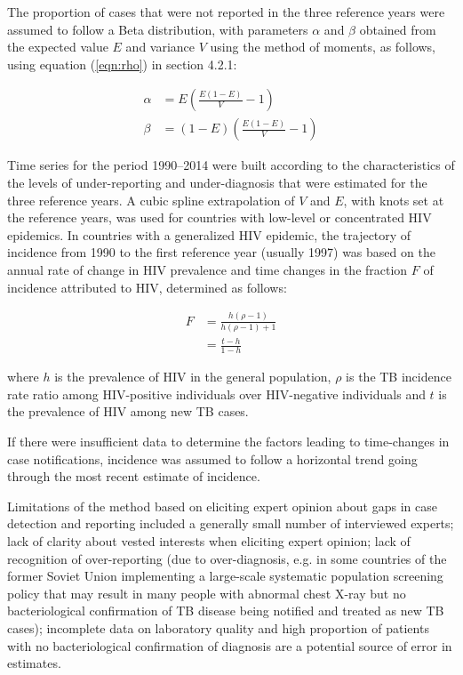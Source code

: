 The proportion of cases that were not reported in the three reference years were assumed to follow a Beta distribution, with parameters $\alpha$ and $\beta$ obtained from the expected value $E$ and variance $V$ using the method of moments\cite{Renyi2007}, as follows, using equation (\ref{eqn:rho}) in section 4.2.1: 

\begin{equation}
\begin{align}
\alpha &= E \left(\frac{E(1-E)}{V} - 1 \right) \\
\beta  &= (1-E)\left(\frac{E(1-E)}{V} - 1 \right)
\label{eqn:betamoments}
\end{align}
\end{equation}

Time series for the period 1990–2014 were built according to the characteristics of the levels of under-reporting and under-diagnosis that were estimated for the three reference years. A cubic spline extrapolation of $V$ and $E$, with knots set at the reference years, was used for countries with low-level or concentrated HIV epidemics. In countries with a generalized HIV epidemic, the trajectory of incidence from 1990 to the first reference year (usually 1997) was based on the annual rate of change in HIV prevalence and time changes in the fraction $F$ of incidence attributed to HIV, determined as follows:

\begin{align*}
F &= \frac{h(\rho - 1)}{h(\rho - 1) + 1} \\
  &= \frac{t - h}{1 - h}
\end{align*}

where $h$ is the prevalence of HIV in the general population, $\rho$ is the TB incidence rate ratio among HIV-positive individuals over HIV-negative individuals and $t$ is the prevalence of HIV among new TB cases.

If there were insufficient data to determine the factors leading to time-changes in case notifications, incidence was assumed to follow a horizontal trend going through the most recent estimate of incidence. 

Limitations of the method based on eliciting expert opinion about gaps in case detection and reporting included a generally small number of interviewed experts; lack of clarity about vested interests when eliciting expert opinion; lack of recognition of over-reporting (due to over-diagnosis,  e.g. in some countries of the former Soviet Union implementing a large-scale systematic population screening policy that may result in many people with abnormal chest X-ray but no bacteriological confirmation of TB disease being notified and treated as new TB cases); incomplete data on laboratory quality and high proportion of patients with no bacteriological confirmation of diagnosis are a potential source of error in estimates.



